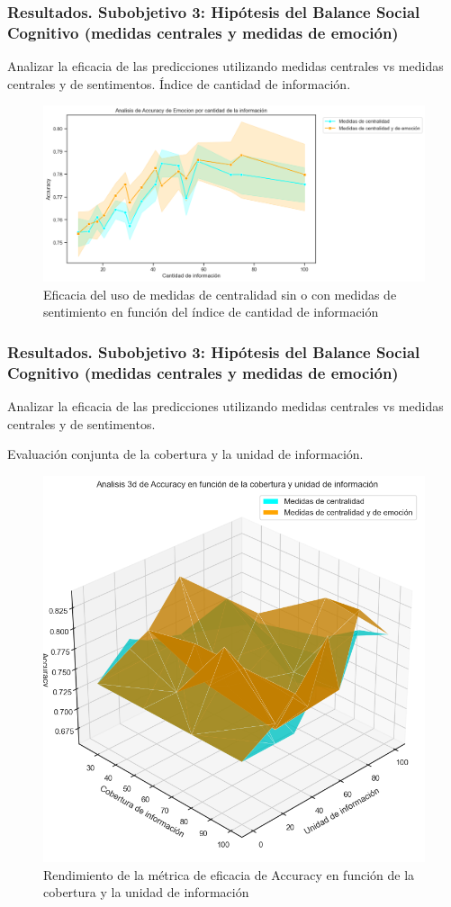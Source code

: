 \documentclass{beamer}
\begin{document}
\begin{frame}
	\frametitle{Resultados. Subobjetivo 3: Hipótesis del Balance Social Cognitivo (medidas centrales y medidas de emoción)}
\begin{block}{Analizar la eficacia de las predicciones utilizando
		medidas centrales vs medidas centrales y de sentimentos.}
		Índice de cantidad de información.
	\end{block}
	
	
\begin{figure}[H]
	\centering
	\includegraphics[width=0.6\linewidth]{figs/cap7/figura_55}
	\caption{Eficacia del uso de medidas de centralidad sin o con medidas de sentimiento en función del índice de cantidad de información}
	\label{fig:figura231}
\end{figure}

	
	
	
\end{frame}



\begin{frame}
	\frametitle{Resultados. Subobjetivo 3: Hipótesis del Balance Social Cognitivo (medidas centrales y medidas de emoción)}
\begin{block}{Analizar la eficacia de las predicciones utilizando
		medidas centrales vs medidas centrales y de sentimentos.}
		

	Evaluación conjunta de la cobertura y la unidad de información.
	\end{block}	
\begin{figure}[H]
	\centering
	\includegraphics[width=0.45\linewidth]{figs/cap7/figura_56}
	\caption{Rendimiento de la métrica de eficacia de Accuracy en función de la cobertura y la unidad de información}
	
	\label{fig:figura233}
\end{figure}
	
\end{frame}
\end{document}
